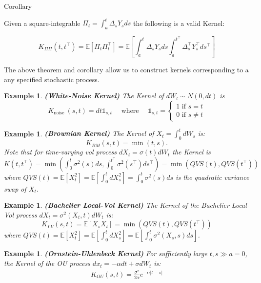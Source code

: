 \documentclass[11pt]{article}
\theoremstyle{plain} %
\newtheorem{example}[theorem]{Example}
\theoremstyle{remark}
\newcommand{\bOne}{\mathds{1}}
\begin{document}
Corollary

Given a square-integrable $\Pi_{t}=\int_{a}^{t} \Delta_{s} Y_{s} d s$ the
following is a valid Kernel:

$$
  K_{\Pi \Pi}\left(t, t^\top\right)=\mathbb{E}\left[\Pi_{t} \Pi_{t}^\top\right]=\mathbb{E}\left[\int_{a}^{t} \Delta_{s} Y_{s} d s \int_{a}^{t^\top} \Delta_{s}^\top Y_{s}^\top d s^\top\right]
$$

The above theorem and corollary allow us to construct kernels corresponding to a
any specified stochastic process.

\begin{example}
  \textbf{(White-Noise Kernel)} The Kernel of $d W_{t} \sim N(0, d t)$ is
  $$
    K_{\text {noise }}(s, t)=d t \bOne_{s, t}
    \quad \text{ where } \quad
    \bOne_{s, t}=
    \begin{cases}
      1 \text{ if } s=t \\
      0 \text{ if } s\neq t
    \end{cases}
  $$
\end{example}

\begin{example}
  \textbf{(Brownian Kernel)} The Kernel of $X_{t}=\int_{0}^{t} d W_{s}$ is:
  $$
    K_{B M}(s, t)=\min (t, s) .
  $$
  Note that for time-varying vol process $d X_{t}=\sigma(t) d W_{t}$ the Kernel is
  $K\left(t, t^\top\right)=\min \left(\int_{0}^{t} \sigma^{2}(s) d s,
    \int_{0}^{t^\top} \sigma^{2}\left(s^\top\right) d s^\top\right)=\min \left(Q V
    S(t), Q V S\left(t^\top\right)\right)$ where $Q V
    S(t)=\mathbb{E}\left[X_{t}^{2}\right]=\mathbb{E}\left[\int_{0}^{t} d
      X_{s}^{2}\right]=\int_{0}^{t} \sigma^{2}(s) d s$ is the quadratic variance swap
  of $X_{t}$.
\end{example}

\begin{example}
  \textbf{(Bachelier Local-Vol Kernel)} The Kernel of the Bachelier Local-Vol process $d X_{t}=\sigma^{2}\left(X_{t},
    t\right) d W_{t}$ is:
  $$
    K_{L V}(s, t)=\mathbb{E}\left[X_{s} X_{t}\right]=\min \left(Q V S(t), Q V S\left(t^\top\right)\right)
  $$
  where $Q V S(t)=\mathbb{E}\left[X_{t}^{2}\right]=\mathbb{E}\left[\int_{0}^{t} d
      X_{s}^{2}\right]=\mathbb{E}\left[\int_{0}^{t} \sigma^{2}\left(X_{s}, s\right) d
      s\right]$.
\end{example}

\begin{example}
  \textbf{(Ornstein-Uhlenbeck Kernel)} For sufficiently large $t, s \gg a=0$, the Kernel of the OU process $d
    x_{t}=-\alpha d t+\sigma d W_{t}$ is:
  \begin{align}
    K_{O U}(s, t)=\frac{\sigma^{2}}{2 \alpha} e^{-\alpha|t-s|}
    \label{eq: OU kernel}
  \end{align}
\end{example}
\end{document}
